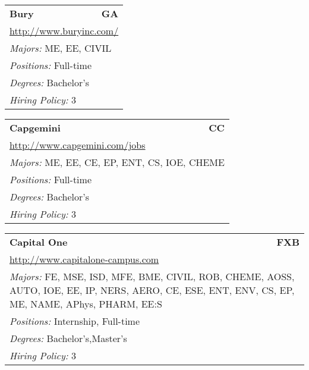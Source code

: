 \documentclass[twoside]{article}
\begin{document}
\begin{center}
\begin{multicols}{3}
\begin{FlushLeft}
\begin{minipage}{\columnwidth}
\end{minipage}
 
\begin{minipage}{\columnwidth}\begin{tabularx}{.95\columnwidth}{Xr}
                 {\Large\bf Bury} & {\Large\bf GA}\\
    \multicolumn{2}{p{.95\columnwidth}}{\url{http://www.buryinc.com/}}\\
    \multicolumn{2}{p{.95\columnwidth}}{\emph{Majors:} ME, EE, CIVIL}\\
    \multicolumn{2}{p{.95\columnwidth}}{\emph{Positions:} Full-time}\\
    \multicolumn{2}{p{.95\columnwidth}}{\emph{Degrees:} Bachelor's}\\
    \multicolumn{2}{p{.95\columnwidth}}{\emph{Hiring Policy:} 3}\\
    \end{tabularx}
    
\end{minipage}
 
\begin{minipage}{\columnwidth}\begin{tabularx}{.95\columnwidth}{Xr}
                 {\Large\bf Capgemini} & {\Large\bf CC}\\
    \multicolumn{2}{p{.95\columnwidth}}{\url{http://www.capgemini.com/jobs}}\\
    \multicolumn{2}{p{.95\columnwidth}}{\emph{Majors:} ME, EE, CE, EP, ENT, CS, IOE, CHEME}\\
    \multicolumn{2}{p{.95\columnwidth}}{\emph{Positions:} Full-time}\\
    \multicolumn{2}{p{.95\columnwidth}}{\emph{Degrees:} Bachelor's}\\
    \multicolumn{2}{p{.95\columnwidth}}{\emph{Hiring Policy:} 3}\\
    \end{tabularx}
    
\end{minipage}
 
\begin{minipage}{\columnwidth}\begin{tabularx}{.95\columnwidth}{Xr}
                 {\Large\bf Capital One} & {\Large\bf FXB}\\
    \multicolumn{2}{p{.95\columnwidth}}{\url{http://www.capitalone-campus.com}}\\
    \multicolumn{2}{p{.95\columnwidth}}{\emph{Majors:} FE, MSE, ISD, MFE, BME, CIVIL, ROB, CHEME, AOSS, AUTO, IOE, EE, IP, NERS, AERO, CE, ESE, ENT, ENV, CS, EP, ME, NAME, APhys, PHARM, EE:S}\\
    \multicolumn{2}{p{.95\columnwidth}}{\emph{Positions:} Internship, Full-time}\\
    \multicolumn{2}{p{.95\columnwidth}}{\emph{Degrees:} Bachelor's,Master's}\\
    \multicolumn{2}{p{.95\columnwidth}}{\emph{Hiring Policy:} 3}\\
    \end{tabularx}
    

\end{minipage}
\end{FlushLeft}
\end{multicols}
\end{center}
\end{document}
